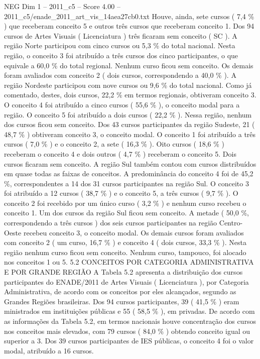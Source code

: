 \begin{textsample}{NEG Dim 1 – 2011\_c5 – Score 4.00 – 2011\_c5/enade\_2011\_art\_vis\_14aea27cb0.txt}
Houve, ainda, sete cursos ( 7,4 \% ) que receberam conceito 5 e outros três cursos que receberam conceito 1.
Dos 94 cursos de Artes Visuais ( Licenciatura ) três ficaram sem conceito ( SC ).
A região Norte participou com cinco cursos ou 5,3 \% do total nacional.
Nesta região, o conceito 3 foi atribuído a três cursos dos cinco participantes, o que equivale a 60,0 \% do total regional.
Nenhum curso ficou sem conceito.
Os demais foram avaliados com conceito 2 ( dois cursos, correspondendo a 40,0 \% ).
A região Nordeste participou com nove cursos ou 9,6 \% do total nacional.
Como já comentado, destes, dois cursos, 22,2 \% em termos regionais, obtiveram conceito 3.
O conceito 4 foi atribuído a cinco cursos ( 55,6 \% ), o conceito modal para a região.
O conceito 5 foi atribuído a dois cursos ( 22,2 \% ).
Nessa região, nenhum dos cursos ficou sem conceito.
Dos 43 cursos participantes da região Sudeste, 21 ( 48,7 \% ) obtiveram conceito 3, o conceito modal.
O conceito 1 foi atribuído a três cursos ( 7,0 \% ) e o conceito 2, a sete ( 16,3 \% ).
Oito cursos ( 18,6 \% ) receberam o conceito 4 e dois outros ( 4,7 \% ) receberam o conceito 5.
Dois cursos ficaram sem conceito.
A região Sul também contou com cursos distribuídos em quase todas as faixas de conceitos.
A predominância do conceito 4 foi de 45,2 \%, correspondentes a 14 dos 31 cursos participantes na região Sul.
O conceito 3 foi atribuído a 12 cursos ( 38,7 \% ) e o conceito 5, a três cursos ( 9,7 \% ).
O conceito 2 foi recebido por um único curso ( 3,2 \% ) e nenhum curso recebeu o conceito 1.
Um dos cursos da região Sul ficou sem conceito.
A metade ( 50,0 \%, correspondendo a três cursos ) dos seis cursos participantes na região Centro-Oeste recebeu conceito 3, o conceito modal.
Os demais cursos foram avaliados com conceito 2 ( um curso, 16,7 \% ) e conceito 4 ( dois cursos, 33,3 \% ).
Nesta região nenhum curso ficou sem conceito.
Nenhum curso, tampouco, foi alocado nos conceitos 1 ou 5. 5.2 CONCEITOS POR CATEGORIA ADMINISTRATIVA E POR GRANDE REGIÃO A Tabela 5.2 apresenta a distribuição dos cursos participantes do ENADE/2011 de Artes Visuais ( Licenciatura ), por Categoria Administrativa, de acordo com os conceitos por eles alcançados, segundo as Grandes Regiões brasileiras.
Dos 94 cursos participantes, 39 ( 41,5 \% ) eram ministrados em instituições públicas e 55 ( 58,5 \% ), em privadas.
De acordo com as informações da Tabela 5.2, em termos nacionais houve concentração dos cursos nos conceitos mais elevados, com 79 cursos ( 84,0 \% ) obtendo conceito igual ou superior a 3.
Dos 39 cursos participantes de IES públicas, o conceito 4 foi o valor modal, atribuído a 16 cursos.

\end{textsample}
